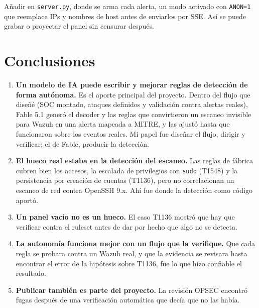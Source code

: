 \documentclass{mapc-proyecto}
\begin{document}
\begin{recomendacion}
Añadir en \texttt{server.py}, donde se arma cada alerta, un modo activado con
\texttt{ANON=1} que reemplace IPs y nombres de host antes de enviarlos por SSE.
Así se puede grabar o proyectar el panel sin censurar después.
\end{recomendacion}

\section{Conclusiones}

\begin{enumerate}
  \item \textbf{Un modelo de IA puede escribir y mejorar reglas de detección de
        forma autónoma.} Es el aporte principal del proyecto. Dentro del flujo
        que diseñé (SOC montado, ataques definidos y validación contra alertas
        reales), Fable 5.1 generó el decoder y las reglas que convirtieron un
        escaneo invisible para Wazuh en una alerta mapeada a MITRE, y las ajustó
        hasta que funcionaron sobre los eventos reales. Mi papel fue diseñar el
        flujo, dirigir y verificar; el de Fable, producir la detección.
  \item \textbf{El hueco real estaba en la detección del escaneo.} Las reglas de fábrica cubren
        bien los accesos, la escalada de privilegios con \texttt{sudo} (T1548) y
        la persistencia por creación de cuentas (T1136), pero no
        correlacionan un escaneo de red contra OpenSSH 9.x. Ahí fue donde la
        detección como código aportó.
  \item \textbf{Un panel vacío no es un hueco.} El caso T1136 mostró que hay que
        verificar contra el ruleset antes de dar por hecho que algo no se
        detecta.
  \item \textbf{La autonomía funciona mejor con un flujo que la verifique.} Que
        cada regla se probara contra un Wazuh real, y que la evidencia se revisara
        hasta encontrar el error de la hipótesis sobre T1136, fue lo que hizo
        confiable el resultado.
  \item \textbf{Publicar también es parte del proyecto.} La revisión OPSEC encontró
        fugas después de una verificación automática que decía que no las había.
\end{enumerate}

\clearpage
\iniciaranexos
\end{document}
